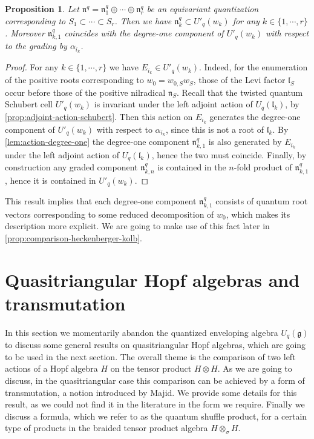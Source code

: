 \documentclass[a4paper, 12pt, reqno, english]{amsart}
\numberwithin{equation}{section}
\numberwithin{figure}{section}
\theoremstyle{plain}
\theoremstyle{plain}
\theoremstyle{plain}
\newtheorem{proposition}[theorem]{Proposition}
\theoremstyle{plain}
\theoremstyle{plain}
\theoremstyle{definition}
\theoremstyle{definition}
\theoremstyle{definition}
\theoremstyle{remark}
\theoremstyle{definition}
\theoremstyle{definition}
\newcommand{\Uqg}{U_q(\mathfrak{g})}
\newcommand{\Uqlk}{U_q(\mathfrak{l}_k)}
\newcommand{\liel}{\mathfrak{l}}
\newcommand{\lien}{\mathfrak{n}}
\newcommand{\tschub}{U'_q}
\newcommand{\qnil}{\lien^q}
\begin{document}
\begin{proposition}
\label{prop:schubert-component}
Let $\qnil = \qnil_1 \oplus \cdots \oplus \qnil_r$ be an equivariant quantization corresponding to $S_1 \subset \cdots \subset S_r$. Then we have $\qnil_k \subset \tschub(w_k)$ for any $k \in \{ 1, \cdots, r \}$.
Moreover $\qnil_{k, 1}$ coincides with the degree-one component of $\tschub(w_k)$ with respect to the grading by $\alpha_{i_k}$.
\end{proposition}

\begin{proof}
For any $k \in \{ 1, \cdots, r \}$ we have $E_{i_k} \in \tschub(w_k)$.
Indeed, for the enumeration of the positive roots corresponding to $w_0 = w_{0, S} w_S$, those of the Levi factor $\liel_S$ occur before those of the positive nilradical $\lien_S$.
Recall that the twisted quantum Schubert cell $\tschub(w_k)$ is invariant under the left adjoint action of $\Uqlk$, by \cref{prop:adjoint-action-schubert}.
Then this action on $E_{i_k}$ generates the degree-one component of $\tschub(w_k)$ with respect to $\alpha_{i_k}$, since this is not a root of $\liel_k$.
By \cref{lem:action-degree-one} the degree-one component $\qnil_{k, 1}$ is also generated by $E_{i_k}$ under the left adjoint action of $\Uqlk$, hence the two must coincide.
Finally, by construction any graded component $\qnil_{k, n}$ is contained in the $n$-fold product of $\qnil_{k, 1}$, hence it is contained in $\tschub(w_k)$.
\end{proof}

This result implies that each degree-one component $\qnil_{k, 1}$ consists of quantum root vectors corresponding to some reduced decomposition of $w_0$, which makes its description more explicit.
We are going to make use of this fact later in \cref{prop:comparison-heckenberger-kolb}.

\section{Quasitriangular Hopf algebras and transmutation}
\label{sec:quasitriangular}

In this section we momentarily abandon the quantized enveloping algebra $\Uqg$ to discuss some general results on quasitriangular Hopf algebras, which are going to be used in the next section.
The overall theme is the comparison of two left actions of a Hopf algebra $H$ on the tensor product $H \otimes H$.
As we are going to discuss, in the quasitriangular case this comparison can be achieved by a form of transmutation, a notion introduced by Majid.
We provide some details for this result, as we could not find it in the literature in the form we require.
Finally we discuss a formula, which we refer to as the quantum shuffle product, for a certain type of products in the braided tensor product algebra $H \otimes_\sigma H$.
\end{document}
